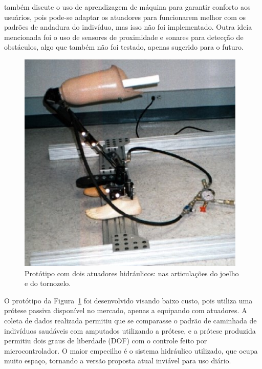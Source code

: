  também discute o uso de aprendizagem de máquina para garantir conforto aos usuários, pois pode-se adaptar os atuadores para funcionarem melhor com os padrões de andadura do indivíduo, mas isso não foi implementado. Outra ideia mencionada foi o uso de sensores de proximidade e sonares para detecção de obstáculos, algo que também não foi testado, apenas sugerido para o futuro.

\begin{figure}[ht]
	\caption{\label{fig:rel_smartleg_1}Protótipo com dois atuadores hidráulicos: nas articulações do joelho e do tornozelo.}
	\begin{center}
	    \includegraphics[width=.5\textwidth]{resources/rel_dedic_smart_leg_1}
	\end{center}
\end{figure}

O protótipo da Figura~\ref{fig:rel_smartleg_1} foi desenvolvido visando baixo custo, pois utiliza uma prótese passiva disponível no mercado, apenas a equipando com atuadores. A coleta de dados realizada permitiu que se comparasse o padrão de caminhada de indivíduos saudáveis com amputados utilizando a prótese, e a prótese produzida permitiu dois graus de liberdade (DOF) com o controle feito por microcontrolador. O maior empecilho é o sistema hidráulico utilizado, que ocupa muito espaço, tornando a versão proposta atual inviável para uso diário.


